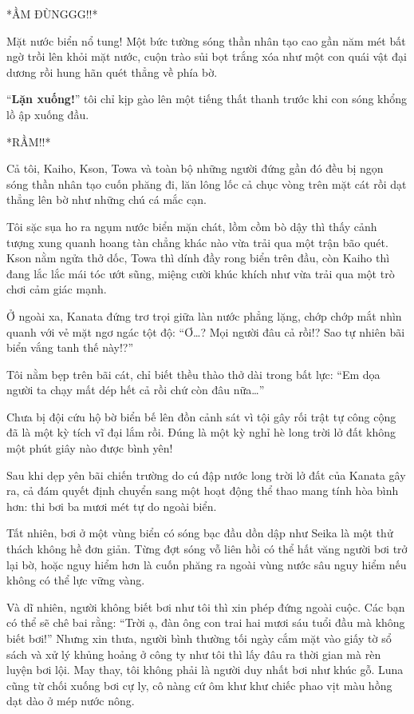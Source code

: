 \documentclass[../main.tex]{subfiles}
\begin{document}
*ẦM ĐÙNGGG!!*

Mặt nước biển nổ tung! Một bức tường sóng thần nhân tạo cao gần năm mét bất ngờ trồi lên khỏi mặt nước, cuộn trào sủi bọt trắng xóa như một con quái vật đại dương rồi hung hãn quét thẳng về phía bờ.

``\textbf{Lặn xuống!}'' tôi chỉ kịp gào lên một tiếng thất thanh trước khi con sóng khổng lồ ập xuống đầu.

*RẦM!!*

Cả tôi, Kaiho, Kson, Towa và toàn bộ những người đứng gần đó đều bị ngọn sóng thần nhân tạo cuốn phăng đi, lăn lông lốc cả chục vòng trên mặt cát rồi dạt thẳng lên bờ như những chú cá mắc cạn.

Tôi sặc sụa ho ra ngụm nước biển mặn chát, lồm cồm bò dậy thì thấy cảnh tượng xung quanh hoang tàn chẳng khác nào vừa trải qua một trận bão quét. Kson nằm ngửa thở dốc, Towa thì dính đầy rong biển trên đầu, còn Kaiho thì đang lắc lắc mái tóc ướt sũng, miệng cười khúc khích như vừa trải qua một trò chơi cảm giác mạnh.

Ở ngoài xa, Kanata đứng trơ trọi giữa làn nước phẳng lặng, chớp chớp mắt nhìn quanh với vẻ mặt ngơ ngác tột độ: ``Ơ\dots? Mọi người đâu cả rồi!? Sao tự nhiên bãi biển vắng tanh thế này!?''

Tôi nằm bẹp trên bãi cát, chỉ biết thều thào thở dài trong bất lực: ``Em dọa người ta chạy mất dép hết cả rồi chứ còn đâu nữa\dots''

Chưa bị đội cứu hộ bờ biển bế lên đồn cảnh sát vì tội gây rối trật tự công cộng đã là một kỳ tích vĩ đại lắm rồi. Đúng là một kỳ nghỉ hè long trời lở đất không một phút giây nào được bình yên!

\ct

Sau khi dẹp yên bãi chiến trường do cú đập nước long trời lở đất của Kanata gây ra, cả đám quyết định chuyển sang một hoạt động thể thao mang tính hòa bình hơn: thi bơi ba mươi mét tự do ngoài biển.

Tất nhiên, bơi ở một vùng biển có sóng bạc đầu dồn dập như Seika là một thử thách không hề đơn giản. Từng đợt sóng vỗ liên hồi có thể hất văng người bơi trở lại bờ, hoặc nguy hiểm hơn là cuốn phăng ra ngoài vùng nước sâu nguy hiểm nếu không có thể lực vững vàng.

Và dĩ nhiên, người không biết bơi như tôi thì xin phép đứng ngoài cuộc. Các bạn có thể sẽ chê bai rằng: ``Trời ạ, đàn ông con trai hai mươi sáu tuổi đầu mà không biết bơi!'' Nhưng xin thưa, người bình thường tối ngày cắm mặt vào giấy tờ sổ sách và xử lý khủng hoảng ở công ty như tôi thì lấy đâu ra thời gian mà rèn luyện bơi lội. May thay, tôi không phải là người duy nhất bơi như khúc gỗ. Luna cũng từ chối xuống bơi cự ly, cô nàng cứ ôm khư khư chiếc phao vịt màu hồng dạt dào ở mép nước nông.
\end{document}

